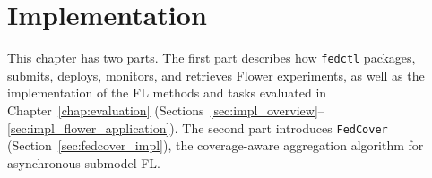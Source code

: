 \chapter{Implementation}
\label{chap:implementation}

\newcommand{\impltagplain}[2]{\texorpdfstring{\textsuperscript{\textbf{\textcolor{#1}{[#2]}}}}{[#2]}}
\newcommand{\impltag}[3]{\texorpdfstring{\hyperlink{#1}{\textsuperscript{\textbf{\textcolor{#2}{[#3]}}}}}{[#3]}}
\newcommand{\impltaghead}[3]{\protect\hyperlink{#1}{\impltagplain{#2}{#3}}}
\newcommand{\runconf}{\impltag{implcomp:run}{darkblue}{run}}
\newcommand{\deployconf}{\impltag{implcomp:dep}{darkblue}{dep}}
\newcommand{\fedctlcli}{\impltag{implcomp:request}{paletteGreen}{cli}}
\newcommand{\submitsvc}{\impltag{implcomp:request}{paletteGreen}{svc}}
\newcommand{\regtag}{\impltag{implcomp:deploy}{paletteGreen}{reg}}
\newcommand{\nomadrenderer}{\impltag{implcomp:deploy}{paletteGreen}{nomad}}
\newcommand{\submitrunner}{\impltag{implcomp:deploy}{paletteGreen}{runner}}
\newcommand{\distroles}{\impltag{implcomp:runtime}{paletteOrange}{roles}}
\newcommand{\researchapp}{\impltag{implcomp:runtime}{paletteOrange}{app}}
\newcommand{\wandbtag}{\impltag{implcomp:observability}{gray}{wandb}}
\newcommand{\artifacttag}{\impltag{implcomp:observability}{gray}{art}}
\newcommand{\uilogstag}{\impltag{implcomp:observability}{gray}{ui}}
\newcommand{\substratetag}{\impltag{implcomp:substrate}{fedstalebrown}{cluster}}
\newcommand{\implterm}[2]{\textcolor{#1}{#2}}

This chapter has two parts. The first part describes how \texttt{fedctl} packages, submits, deploys, monitors, and retrieves Flower experiments, as well as the implementation of the FL methods and tasks evaluated in Chapter~\ref{chap:evaluation} (Sections~\ref{sec:impl_overview}--\ref{sec:impl_flower_application}). The second part introduces \texttt{FedCover} (Section~\ref{sec:fedcover_impl}), the coverage-aware aggregation algorithm for asynchronous submodel FL.

